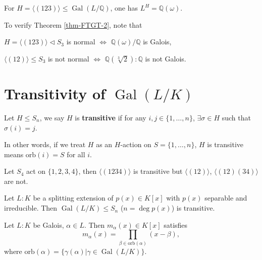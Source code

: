 \begin{example}
    For $H=\langle(123)\rangle\leq \operatorname{Gal}(L /\mathbb{Q})$, one has $L^{H}=\mathbb{Q}(\omega)$. 

    \medskip
    To verify Theorem \ref{thm-FTGT-2}, note that 
    \begin{center}
        $H=\langle(123)\rangle\lhd S_{3}$ is normal $\iff$ $\mathbb{Q}(\omega) /\mathbb{Q}$ is Galois,
    \end{center} 
    \begin{center}
    $\langle(12)\rangle\leq S_{3}$ is not normal $\iff$ $\mathbb{Q}(\sqrt[3]{2}) :\mathbb{Q}$ is not Galois.     
    \end{center}
\end{example}

\section{Transitivity of $\operatorname{Gal}(L/K)$}

\begin{definition}
    Let $H\leq S_{n}$, we say $H$ is {\bf transitive} if for any $i,j\in \{1,\dots,n\}$, $\exists \sigma\in H$ such that $\sigma(i)=j$. 
\end{definition}

In other words, if we treat $H$ as an $H$-action on $S=\{1,\dots, n\}$, $H$ is transitive means $\mathrm{orb}(i)=S$ for all $i$. 

\begin{example}
    Let $S_{4}$ act on $\{1,2,3,4\}$, then $\langle(1234)\rangle$ is transitive but $\langle(12)\rangle$, $\langle(12)(34)\rangle$ are not. 
\end{example}

\begin{theorem}\label{thm-transitivityGaloisGroup}
    Let $L :K$ be a splitting extension of $p(x)\in K[x]$ with $p(x)$ separable and irreducible. Then $\operatorname{Gal}(L /K)\leq S_{n}$ ($n=\deg p(x)$) is transitive. 
\end{theorem}

\begin{lemma}\label{lem-orbitMinimalPoly}
    Let $L :K$ be Galois, $\alpha\in L$. Then $m_{\alpha}(x)\in K[x]$ satisfies 
    $$m_{\alpha}(x)=\prod_{\beta\in \mathrm{orb}(\alpha)}(x-\beta),$$ where $\mathrm{orb}(\alpha)=\{\gamma(\alpha)|\gamma\in \operatorname{Gal}(L /K)\}$. 
\end{lemma}

